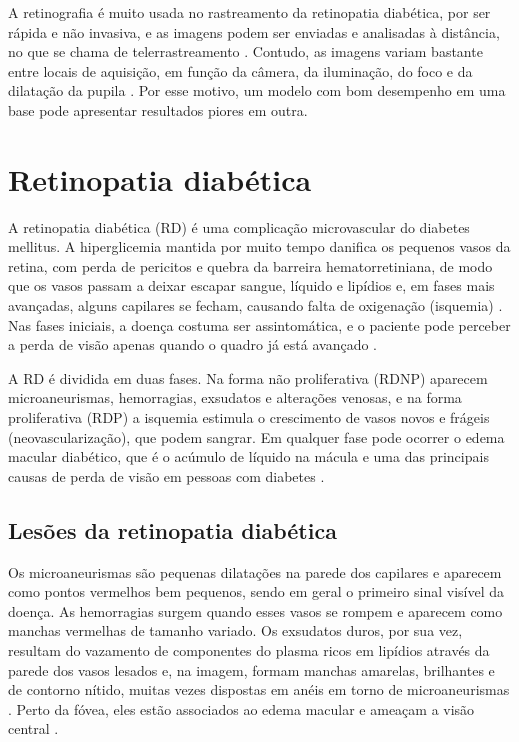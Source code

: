 A retinografia é muito usada no rastreamento da retinopatia diabética, por ser rápida e não invasiva, e as imagens podem ser enviadas e analisadas à distância, no que se chama de telerrastreamento \cite{abramoff2010retinal}. Contudo, as imagens variam bastante entre locais de aquisição, em função da câmera, da iluminação, do foco e da dilatação da pupila \cite{abramoff2010retinal}. Por esse motivo, um modelo com bom desempenho em uma base pode apresentar resultados piores em outra.

\section{Retinopatia diabética}
\label{sec:retinopatia}

A retinopatia diabética (RD) é uma complicação microvascular do diabetes mellitus. A hiperglicemia mantida por muito tempo danifica os pequenos vasos da retina, com perda de pericitos e quebra da barreira hematorretiniana, de modo que os vasos passam a deixar escapar sangue, líquido e lipídios e, em fases mais avançadas, alguns capilares se fecham, causando falta de oxigenação (isquemia) \cite{cheung2010dr}. Nas fases iniciais, a doença costuma ser assintomática, e o paciente pode perceber a perda de visão apenas quando o quadro já está avançado \cite{brasil2021pcdtrd}.

A RD é dividida em duas fases. Na forma não proliferativa (RDNP) aparecem microaneurismas, hemorragias, exsudatos e alterações venosas, e na forma proliferativa (RDP) a isquemia estimula o crescimento de vasos novos e frágeis (neovascularização), que podem sangrar. Em qualquer fase pode ocorrer o edema macular diabético, que é o acúmulo de líquido na mácula e uma das principais causas de perda de visão em pessoas com diabetes \cite{cheung2010dr}.

\subsection{Lesões da retinopatia diabética}
\label{sec:lesoes}

Os microaneurismas são pequenas dilatações na parede dos capilares e aparecem como pontos vermelhos bem pequenos, sendo em geral o primeiro sinal visível da doença. As hemorragias surgem quando esses vasos se rompem e aparecem como manchas vermelhas de tamanho variado. Os exsudatos duros, por sua vez, resultam do vazamento de componentes do plasma ricos em lipídios através da parede dos vasos lesados e, na imagem, formam manchas amarelas, brilhantes e de contorno nítido, muitas vezes dispostas em anéis em torno de microaneurismas \cite{negi2003eye}. Perto da fóvea, eles estão associados ao edema macular e ameaçam a visão central \cite{cheung2010dr}.

